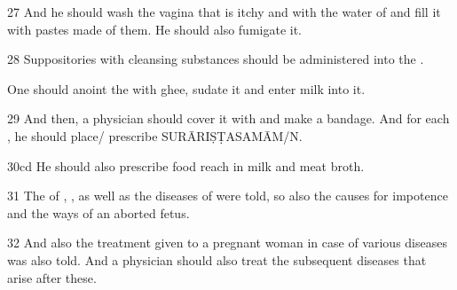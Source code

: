 \begin{translation}
\item [27]
And he should wash the vagina that is itchy and  with the water of  and fill it with pastes 
made of them. He should also fumigate it.

\item [28]
Suppositories with cleansing substances should be administered into the 
.

One should anoint the  with ghee, sudate it and enter milk 
into it. 

\item [29] 
And then, a physician should cover it with  and make a bandage. 
And for each , he should place/ prescribe 
SURĀRIṢṬASAMĀM/N.

\item [30cd]
He should also prescribe food reach in milk and meat broth.

\item [31]
The  of , , 
 as well as the diseases of  were told, so also the 
causes for impotence and the ways of an aborted fetus. 

\item [32] 
And also the treatment given to a pregnant woman in case of various diseases 
was also told. And a physician should also treat the subsequent diseases that 
arise after these.  

\end{translation}